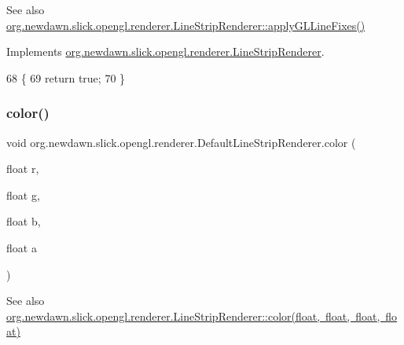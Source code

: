 \begin{DoxySeeAlso}{See also}
\mbox{\hyperlink{interfaceorg_1_1newdawn_1_1slick_1_1opengl_1_1renderer_1_1_line_strip_renderer_a6cacd7974c575c5e49034a89a51492c2}{org.\+newdawn.\+slick.\+opengl.\+renderer.\+Line\+Strip\+Renderer\+::apply\+G\+L\+Line\+Fixes()}} 
\end{DoxySeeAlso}


Implements \mbox{\hyperlink{interfaceorg_1_1newdawn_1_1slick_1_1opengl_1_1renderer_1_1_line_strip_renderer_a6cacd7974c575c5e49034a89a51492c2}{org.\+newdawn.\+slick.\+opengl.\+renderer.\+Line\+Strip\+Renderer}}.


\begin{DoxyCode}
68                                       \{
69         \textcolor{keywordflow}{return} \textcolor{keyword}{true};
70     \}
\end{DoxyCode}
\mbox{\label{classorg_1_1newdawn_1_1slick_1_1opengl_1_1renderer_1_1_default_line_strip_renderer_ae236140384772f798e2d6e9a1faacdd5}} 
\subsubsection{\texorpdfstring{color()}{color()}}
{\footnotesize\ttfamily void org.\+newdawn.\+slick.\+opengl.\+renderer.\+Default\+Line\+Strip\+Renderer.\+color (\begin{DoxyParamCaption}\item[{float}]{r,  }\item[{float}]{g,  }\item[{float}]{b,  }\item[{float}]{a }\end{DoxyParamCaption})\hspace{0.3cm}{\ttfamily [inline]}}

\begin{DoxySeeAlso}{See also}
\mbox{\hyperlink{interfaceorg_1_1newdawn_1_1slick_1_1opengl_1_1renderer_1_1_line_strip_renderer_ac54eda776408b41d1e5ccaa988267162}{org.\+newdawn.\+slick.\+opengl.\+renderer.\+Line\+Strip\+Renderer\+::color(float, float, float, float)}} 
\end{DoxySeeAlso}


